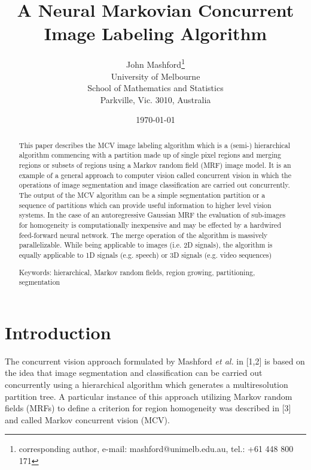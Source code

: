 \documentclass[12pt,twoside]{article}
\newcommand{\bl}{\color{blue}}
\newcommand{\rf}{\vskip .1in\par\sloppy\hangindent=1pc\hangafter=1
                 \noindent}
\begin{document}
\title{\bf A Neural Markovian Concurrent Image Labeling Algorithm}
\author{John Mashford\footnote{corresponding author, e-mail: mashford@unimelb.edu.au, tel.: +61 448 800 171}  \\
University of Melbourne \\
School of Mathematics and Statistics \\
Parkville, Vic. 3010, Australia}
\date{\today}
\maketitle

\begin{abstract}

This paper describes the MCV image labeling algorithm which is a (semi-) hierarchical algorithm commencing with a
partition made up of single pixel regions and merging regions or subsets of regions using a Markov random field (MRF) image
model. It is an example of a general approach to computer vision called concurrent vision in which the operations of image
segmentation and image classification are carried out concurrently. The output of the MCV algorithm can be a simple
segmentation partition or a sequence of partitions which can provide useful information to higher level vision systems. In the
case of an autoregressive Gaussian MRF the evaluation of sub-images for homogeneity is computationally inexpensive and
may be effected by a hardwired feed-forward neural network. The merge operation of the algorithm is massively parallelizable. While being applicable to images (i.e. 2D signals), the algorithm is equally applicable to 1D signals (e.g. speech) or 3D signals (e.g. video sequences)

Keywords: hierarchical, Markov random fields, region growing, partitioning, segmentation

\end{abstract}

\section{Introduction}

The concurrent vision approach formulated by Mashford {\em et al.} in [1,2] is based on the idea
that image segmentation and classification can be carried out concurrently using a hierarchical
algorithm which generates a multiresolution partition tree. A particular instance of this
approach utilizing Markov random fields (MRFs) to define a criterion for region homogeneity
was described in [3] and called Markov concurrent vision (MCV).
\end{document}
